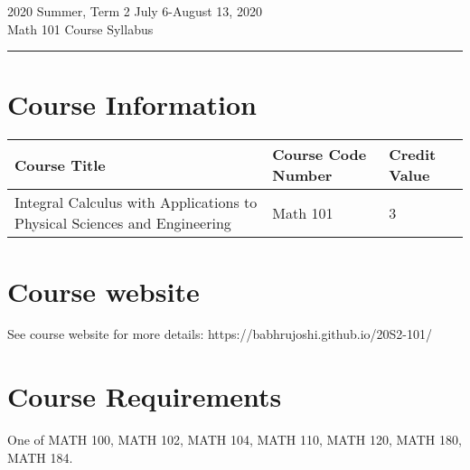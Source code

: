 \documentclass[12pt,usletter]{article} %
\begin{document}
\setlength{\parindent}{0pt}
\setlength{\parskip}{6pt}
\newcommand{\funky}{\hbox to 0pt{y}\hbox to 1ex{\hss'\hss}}
\newcommand{\musqueam}{\textipa{\sffamily x\textsuperscript{w}m\textschwa\texttheta k\textsuperscript{w}\textschwa\textvbaraccent y\textschwa m}}

\newcommand{\squamish}{\textipa{skw\textopeno:m\textsci\textesh}}
\newcommand{\squamalt}{S\underline{k}w\underline{x}w\'u7mesh}
\newcommand{\stolo}{\textipa{st\'o:l\=o}}
\newcommand{\tsleilwaututh}{\textipa{s\textschwa l'\'\i lw\textschwa ta\textglotstop}}


\begin{center}
\color{headbrown}
\LARGE{2020 Summer, Term 2 July 6-August 13, 2020}
\\
\medskip
\large{Math 101 Course Syllabus}
\\
\vskip -8pt
\rule{\textwidth}{2pt}
\end{center}

\color{textblue}

\section*{Course Information}

\begin{tabu} to \textwidth{ | X[l] | X[l] | X[l] | }
\hline 
\textbf{Course Title} & 
\textbf{Course Code Number} & 
\textbf{Credit Value} \\
\hline
 Integral Calculus with Applications to Physical Sciences
and Engineering & 
Math 101 & 
3 \\
\hline
\end{tabu}

\section*{Course website}
See course website for more details: https://babhrujoshi.github.io/20S2-101/

\section*{Course Requirements}

One of MATH 100, MATH 102, MATH 104, MATH 110, MATH 120, MATH 180, MATH 184.
\end{document}
